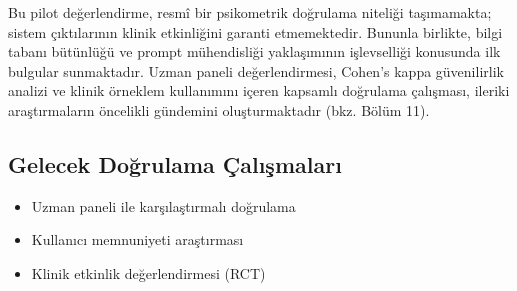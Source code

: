 Bu pilot değerlendirme, resmî bir psikometrik doğrulama niteliği taşımamakta; sistem çıktılarının klinik etkinliğini garanti etmemektedir. Bununla birlikte, bilgi tabanı bütünlüğü ve prompt mühendisliği yaklaşımının işlevselliği konusunda ilk bulgular sunmaktadır. Uzman paneli değerlendirmesi, Cohen's kappa güvenilirlik analizi ve klinik örneklem kullanımını içeren kapsamlı doğrulama çalışması, ileriki araştırmaların öncelikli gündemini oluşturmaktadır (bkz. Bölüm 11).

\subsection{Gelecek Doğrulama Çalışmaları}

\begin{itemize}
  \item Uzman paneli ile karşılaştırmalı doğrulama
  \item Kullanıcı memnuniyeti araştırması
  \item Klinik etkinlik değerlendirmesi (RCT)
\end{itemize}

\newpage
